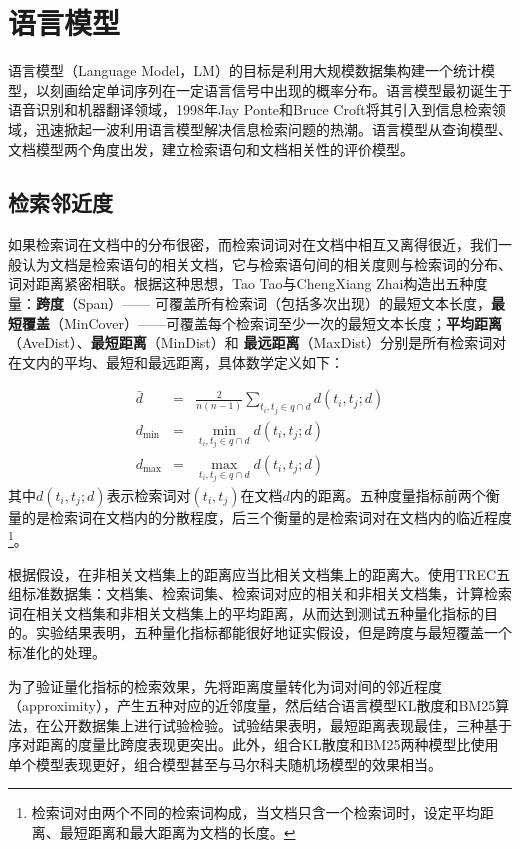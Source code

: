 \chapter{语言模型}
语言模型（Language Model，LM）的目标是利用大规模数据集构建一个统计模型，以刻画给定单词序列在一定语言信号中出现的概率分布。语言模型最初诞生于语音识别和机器翻译领域，1998年Jay Ponte和Bruce Croft\cite{ponte1998language}将其引入到信息检索领域，迅速掀起一波利用语言模型解决信息检索问题的热潮。语言模型从查询模型、文档模型两个角度出发，建立检索语句和文档相关性的评价模型。

\section{检索邻近度}
如果检索词在文档中的分布很密，而检索词词对在文档中相互又离得很近，我们一般认为文档是检索语句的相关文档，它与检索语句间的相关度则与检索词的分布、词对距离紧密相联。根据这种思想，Tao Tao与ChengXiang Zhai\cite{tao2007exploration}构造出五种度量：\textbf{跨度}（Span）—— 可覆盖所有检索词（包括多次出现）的最短文本长度，\textbf{最短覆盖}（MinCover）——可覆盖每个检索词至少一次的最短文本长度；\textbf{平均距离}（AveDist）、\textbf{最短距离}（MinDist）和
\textbf{最远距离}（MaxDist）分别是所有检索词对在文内的平均、最短和最远距离，具体数学定义如下：

\begin{eqnarray}
    \bar d &=& \frac{2}{n(n-1)}\sum\limits_{t_i,t_j \in q\cap d} d(t_i,t_j;d)\\
  d_{\min} &=& \min\limits_{t_i,t_j \in q\cap d} d(t_i,t_j;d) \\
  d_{\max} &=& \max\limits_{t_i,t_j \in q\cap d} d(t_i,t_j;d)
\end{eqnarray}
其中$d(t_i,t_j;d)$表示检索词对$(t_i,t_j)$在文档$d$内的距离。五种度量指标前两个衡量的是检索词在文档内的分散程度，后三个衡量的是检索词对在文档内的临近程度\footnote{检索词对由两个不同的检索词构成，当文档只含一个检索词时，设定平均距离、最短距离和最大距离为文档的长度。}。

根据假设，在非相关文档集上的距离应当比相关文档集上的距离大。使用TREC五组标准数据集：文档集、检索词集、检索词对应的相关和非相关文档集，计算检索词在相关文档集和非相关文档集上的平均距离，从而达到测试五种量化指标的目的。实验结果表明，五种量化指标都能很好地证实假设，但是跨度与最短覆盖一个标准化的处理。

为了验证量化指标的检索效果，先将距离度量转化为词对间的邻近程度（approximity），产生五种对应的近邻度量，然后结合语言模型KL散度和BM25算法，在公开数据集上进行试验检验。试验结果表明，最短距离表现最佳，三种基于序对距离的度量比跨度表现更突出。此外，组合KL散度和BM25两种模型比使用单个模型表现更好，组合模型甚至与马尔科夫随机场模型的效果相当。

